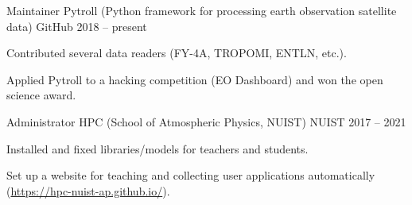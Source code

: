 

\begin{cventries}

  \cventry
    {Maintainer} %
    {Pytroll (Python framework for processing earth observation satellite data)} %
    {GitHub} %
    {2018 -- present} %
    {
      \begin{cvitems} %
        \item {Contributed several data readers (FY-4A, TROPOMI, ENTLN, etc.).}
        \item {Applied Pytroll to a hacking competition (EO Dashboard) and won the open science award.}
      \end{cvitems}
    }

  \cventry
    {Administrator} %
    {HPC (School of Atmospheric Physics, NUIST)} %
    {NUIST} %
    {2017 -- 2021} %
    {
      \begin{cvitems} %
        \item {Installed and fixed libraries/models for teachers and students.}
        \item {Set up a website for teaching and collecting user applications automatically (\url{https://hpc-nuist-ap.github.io/}).}
      \end{cvitems}
    }

\end{cventries}
